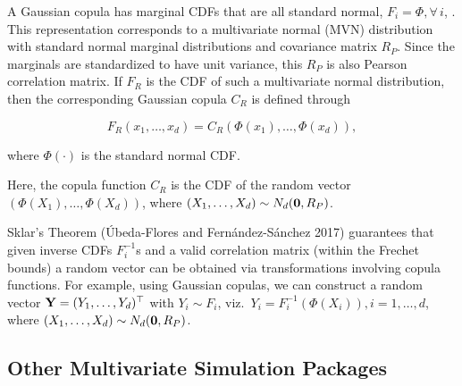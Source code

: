 \documentclass{article}
\begin{document}
A Gaussian copula has marginal CDFs that are all standard normal,
\(F_i = \Phi, \forall \, i\), . This representation corresponds to a
multivariate normal (MVN) distribution with standard normal marginal
distributions and covariance matrix \(R_P\). Since the marginals are
standardized to have unit variance, this \(R_P\) is also Pearson
correlation matrix. If \(F_R\) is the CDF of such a multivariate normal
distribution, then the corresponding Gaussian copula \(C_R\) is defined
through

\begin{equation}
\label{eq:gauss}
F_R(x_1, \ldots, x_d) = C_R(\Phi(x_1), \ldots, \Phi(x_d)),
\end{equation}

where \(\Phi(\cdot)\) is the standard normal CDF.

Here, the copula function \(C_R\) is the CDF of the random vector
\((\Phi(X_1), \ldots, \Phi(X_d))\), where
\((X_1, \ldots, X_d) \sim N_d({\bf 0}, R_P)\).

Sklar's Theorem (Úbeda-Flores and Fernández-Sánchez 2017) guarantees
that given inverse CDFs \(F_i^{-1}\)s and a valid correlation matrix
(within the Frechet bounds) a random vector can be obtained via
transformations involving copula functions. For example, using Gaussian
copulas, we can construct a random vector
\({\bf Y} = (Y_1, \ldots, Y_d)^\top\) with \(Y_i \sim F_i\),
viz.~\(Y_i = F_i^{-1}(\Phi(X_i)), i=1, \ldots, d\), where
\((X_1, \ldots, X_d) \sim N_d({\bf 0}, R_P)\).

\hypertarget{other-multivariate-simulation-packages}{%
\subsection{Other Multivariate Simulation
Packages}\label{other-multivariate-simulation-packages}}
\end{document}
